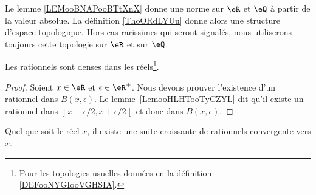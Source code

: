 \begin{definition}      \label{DEFooNYGIooVGHSIA}
	Le lemme \ref{LEMooBNAPooBTtXnX} donne une norme sur \( \eR\) et \( \eQ\) à partir de la valeur absolue. La définition \ref{ThoORdLYUu} donne alors une structure d'espace topologique. Hors cas rarissimes qui seront signalés, nous utiliserons toujours cette topologie sur \( \eR\) et sur \( \eQ\).
\end{definition}

\begin{proposition}     \label{PropooUHNZooOUYIkn}
	Les rationnels sont denses dans les réels\footnote{Pour les topologies usuelles données en la définition \ref{DEFooNYGIooVGHSIA}.}.
\end{proposition}

\begin{proof}
	Soient \( x\in \eR\) et \( \epsilon\in \eR^+\). Nous devons prouver l'existence d'un rationnel dans \( B(x,\epsilon)\). Le lemme~\ref{LemooHLHTooTyCZYL} dit qu'il existe un rationnel dans \( \mathopen] x-\epsilon/2 , x+\epsilon/2 \mathclose[\) et donc dans \( B(x,\epsilon)\).
\end{proof}

\begin{proposition} \label{PropSLCUooUFgiSR}
	Quel que soit le réel \( x\), il existe une suite croissante de rationnels convergente vers \( x\).
\end{proposition}

